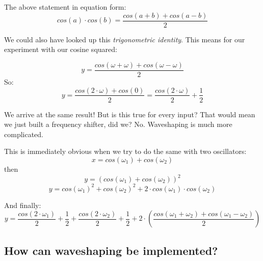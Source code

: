 The above statement in equation form:
\begin{equation}
	cos(a)\cdot cos(b) = \frac{cos(a+b) + cos(a-b)}{2}
\end{equation}

We could also have looked up this \textit{trigonometric identity}.
This means for our experiment with our cosine squared:

\begin{equation}
y = \frac{cos(\omega+\omega) + cos(\omega-\omega)}{2}
\end{equation}
So:
\begin{equation}
y = \frac{cos(2 \cdot \omega) + cos(0)}{2} = \frac{cos(2 \cdot \omega )}{2}+\frac{1}{2}
\end{equation}

We arrive at the same result!
But is this true for every input? That would mean we just built a frequency shifter, did we? No. Waveshaping is much more complicated.\\

\begin{mdframed}[backgroundcolor=black!10,rightline=false,leftline=false]

This is immediately obvious when we try to do the same with two oscillators:
\begin{equation}
x = cos(\omega_1)+cos(\omega_2)
\end{equation}
then
\begin{equation}
y = (cos(\omega_1)+cos(\omega_2) ) ^2
\end{equation}
\begin{equation}
y = cos(\omega_1)^2+cos(\omega_2)^2+2\cdot cos(\omega_1) \cdot cos(\omega_2)
\end{equation}

And finally:
\begin{equation}
	y = \frac{cos(2 \cdot \omega_1)}{2} + \frac{1}{2} + \frac{cos(2 \cdot \omega_2)}{2} +\frac{1}{2} + 2 \cdot (\frac{cos(\omega_1+\omega_2) + cos(\omega_1-\omega_2)}{2})
\end{equation}


\end{mdframed}

\subsection{How can waveshaping be implemented?} %
\label{sub:how_can_waveshaping_be_implemented_}



